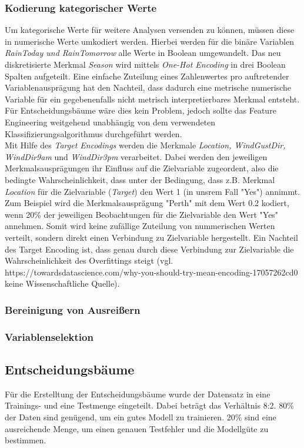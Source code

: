 \subsubsection{Kodierung kategorischer Werte}
Um kategorische Werte für weitere Analysen versenden zu können, müssen diese in numerische Werte umkodiert werden. Hierbei werden für die binäre Variablen \emph{RainToday und RainTomorrow} alle Werte in Boolean umgewandelt. Das neu diskretisierte Merkmal \emph{Season} wird mittels \emph{One-Hot Encoding} in drei Boolean Spalten aufgeteilt. Eine einfache Zuteilung eines Zahlenwertes pro auftretender Variablenausprägung hat den Nachteil, dass dadurch eine metrische numerische Variable für ein gegebenenfalls nicht metrisch interpretierbares Merkmal entsteht. Für Entscheidungsbäume wäre dies kein Problem, jedoch sollte das Feature Engineering weitgehend unabhängig von dem verwendeten Klassifizierungsalgorithmus durchgeführt werden.\\
\noindent \hspace*{7mm}
Mit Hilfe des \emph{Target Encodings} werden die Merkmale \emph{Location, WindGustDir, WindDir9am} und \emph{WindDir3pm} verarbeitet. Dabei werden den jeweiligen Merkmalsausprägungen ihr Einfluss auf die Zielvariable zugeordent, also die bedingte Wahrscheinlichkeit, dass unter der Bedingung, dass z.B. Merkmal \emph{Location} für die Zielvariable (\emph{Target}) den Wert 1 (in unsrem Fall "Yes") annimmt. Zum Beispiel wird die Merkmalsausprägung "Perth" mit dem Wert 0.2 kodiert, wenn 20\% der jeweiligen Beobachtungen für die Zielvariable den Wert "Yes"  annehmen.  Somit wird keine zufällige Zuteilung von nummerischen Werten verteilt, sondern direkt einen Verbindung zu Zielvariable hergestellt. Ein Nachteil des Target Encoding ist, dass genau durch diese Verbindung zur Zielvariable die Wahrscheinlichkeit des Overfittings steigt (vgl. https://towardsdatascience.com/why-you-should-try-mean-encoding-17057262cd0   keine Wissenschaftliche Quelle).

\subsubsection{Bereinigung von Ausreißern}

\subsubsection{Variablenselektion}


\vspace{1cm}
\subsection{Entscheidungsbäume}
Für die Erstelltung der Entscheidungsbäume wurde der Datensatz in eine Trainings- und eine Testmenge eingeteilt. Dabei beträgt das Verhältnis 8:2. 80\% der Daten sind genügend, um ein gutes Modell zu trainieren. 20\% sind eine ausreichende Menge, um einen genauen Testfehler und die Modellgüte zu bestimmen.
